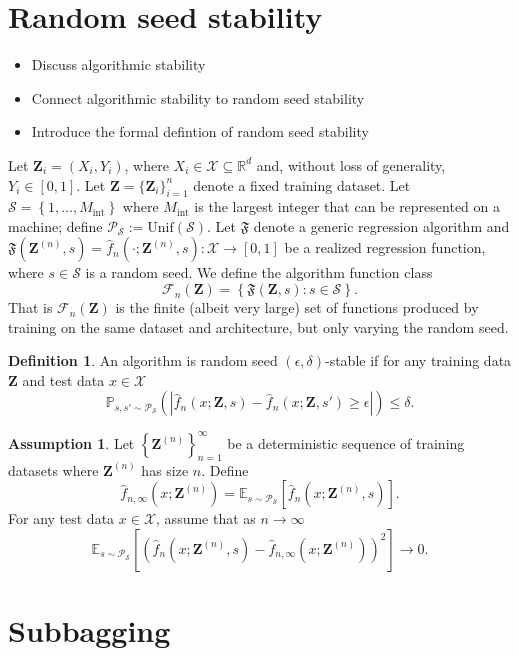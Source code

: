 \documentclass[ejsv2]{imsart}
\theoremstyle{plain}
\theoremstyle{definition}
\newtheorem{definition}[theorem]{Definition}
\newtheorem{assumption}{Assumption}
\theoremstyle{remark}
\newcommand{\E}{\mathds{E}}
\renewcommand{\P}{\mathds{P}}
\newcommand{\Z}{\mathbf{Z}}
\newcommand{\Sset}{\mathcal{S}}
\newcommand{\M}{M_\text{int}}
\newcommand{\Ps}{\mathcal{P}_\Sset}
\begin{document}
\section{Random seed stability}

\begin{itemize}
\item Discuss algorithmic stability
\item Connect algorithmic stability to random seed stability
\item Introduce the formal defintion of random seed stability
\end{itemize}

Let $\Z _i = (X_i,Y_i)$, where $X_i \in \mathcal X \subseteq \mathds{R}^d$ and, without loss of generality, $Y_i \in [0,1]$. Let $\Z = \{\Z_i\}_{i=1}^n$ denote a fixed training dataset. Let $\Sset = \left\{1, \dots, \M\right\}$ where $\M$ is the largest integer that can be represented on a machine; define $\Ps := \text{Unif}(\Sset)$. Let $\mathfrak F$ denote a generic regression algorithm and $\mathfrak{F}(\Z^{(n)}, s) = \hat f_n (\cdot; \Z^{(n)}, s) : \mathcal X \rightarrow [0,1]$ be a realized regression function, where $s \in \Sset$ is a random seed. We define the algorithm function class 
\[
\mathcal F_n (\Z) = \left\{\mathfrak F(\Z, s) : s \in \Sset \right\}.
\]
That is $\mathcal F_n (\Z)$ is the finite (albeit very large) set of functions produced by training on the same dataset and architecture, but only varying the random seed. 

\begin{definition}\label{def:stability}
An algorithm is random seed $(\epsilon,\delta)$-stable if for any training data $\Z$ and test data $x \in \mathcal X$
\[
\P_{s,s' \sim \Ps}\left(\left| \hat f_n(x;\Z,s) - \hat f_n(x;\Z,s') \geq \epsilon \right|\right) \leq \delta.
\]
\end{definition}

\begin{assumption}\label{ass:vav}
Let $\left\{\Z^{(n)}\right\}_{n=1}^\infty$ be a deterministic sequence of training datasets where $\Z^{(n)}$ has size $n$. Define
\[
\hat f_{n,\infty}(x;\Z^{(n)}) = \E_{s \sim \Ps}\left[\hat f_n(x;\Z^{(n)},s) \right].
\]
For any test data $x \in \mathcal X$, assume that as $n \rightarrow \infty$
\[
\E_{s \sim \Ps}\left[\left(\hat f_n(x;\Z^{(n)},s) - \hat f_{n,\infty}(x;\Z^{(n)}) \right)^2 \right] \rightarrow 0.
\]
\end{assumption}

\section{Subbagging}
\end{document}
